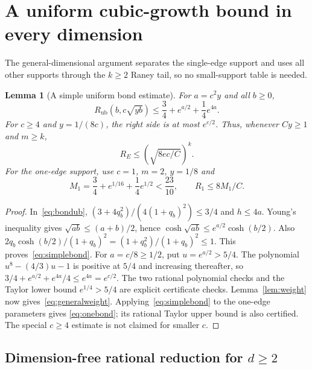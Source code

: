 \documentclass[11pt]{article}
\theoremstyle{plain}
\newtheorem{lemma}{Lemma}
\theoremstyle{remark}
\begin{document}
\section{A uniform cubic-growth bound in every dimension}\label{sec:general}

The general-dimensional argument separates the single-edge support and uses
all other supports through the $k\ge2$ Raney tail, so no small-support table
is needed.

\begin{lemma}[A simple uniform bond estimate]\label{lem:simplebond}
For $a=c^2y$ and all $b\ge0$,
\begin{equation}\label{eq:simplebond}
R_{\mathrm{ub}}(b,c\sqrt{yb})\le\frac34+e^{a/2}+\frac14e^{4a}.
\end{equation}
For $c\ge4$ and $y=1/(8c)$, the right side is at most $e^{c/2}$.
Thus, whenever $Cy\ge1$ and $m\ge k$,
\begin{equation}\label{eq:generalweight}
R_E\le\left(\sqrt{8ec/C}\right)^k.
\end{equation}
For the one-edge support, use $c=1$, $m=2$, $y=1/8$ and
\begin{equation}\label{eq:onebond}
M_1=\frac34+e^{1/16}+\frac14e^{1/2}<\frac{23}{10},
\qquad R_1\le8M_1/C.
\end{equation}
\end{lemma}
\begin{proof}
In~\eqref{eq:bondub}, $(3+4q_b^2)/(4(1+q_b)^2)\le3/4$ and $h\le4a$.
Young's inequality gives $\sqrt{ab}\le(a+b)/2$, hence
$\cosh\sqrt{ab}\le e^{a/2}\cosh(b/2)$.
Also $2q_b\cosh(b/2)/(1+q_b)^2=(1+q_b^2)/(1+q_b)^2\le1$.
This proves~\eqref{eq:simplebond}.
For $a=c/8\ge1/2$, put $u=e^{a/2}>5/4$.
The polynomial $u^8-(4/3)u-1$ is positive at $5/4$ and increasing thereafter,
so $3/4+e^{a/2}+e^{4a}/4\le e^{4a}=e^{c/2}$.
The two rational polynomial checks and the Taylor lower bound
$e^{1/4}>5/4$ are explicit certificate checks.
Lemma~\ref{lem:weight} now gives~\eqref{eq:generalweight}.
Applying~\eqref{eq:simplebond} to the one-edge parameters gives
\eqref{eq:onebond}; its rational Taylor upper bound is also certified.
The special $c\ge4$ estimate is not claimed for smaller $c$.
\end{proof}

\subsection{Dimension-free rational reduction for \texorpdfstring{$d\ge2$}{d >= 2}}\label{sec:generalhigh}
\end{document}

